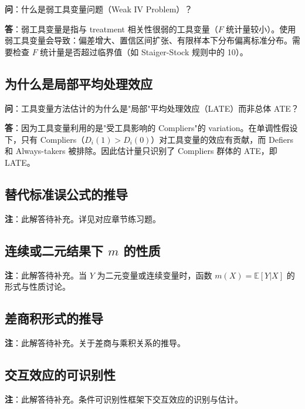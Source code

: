 \textbf{问}：什么是弱工具变量问题（Weak IV Problem）？

\textbf{答}：弱工具变量是指与 treatment 相关性很弱的工具变量（$F$ 统计量较小）。使用弱工具变量会导致：偏差增大、置信区间扩张、有限样本下分布偏离标准分布。需要检查 $F$ 统计量是否超过临界值（如 Staiger-Stock 规则中的 10）。

\subsection{为什么是局部平均处理效应}\label{sec:qa-why-local}

\textbf{问}：工具变量方法估计的为什么是"局部"平均处理效应（LATE）而非总体 ATE？

\textbf{答}：因为工具变量利用的是"受工具影响的 Compliers"的 variation。在单调性假设下，只有 Compliers（$D_i(1) > D_i(0)$）对工具变量的效应有贡献，而 Defiers 和 Always-takers 被排除。因此估计量只识别了 Compliers 群体的 ATE，即 LATE。


\subsection*{替代标准误公式的推导}\label{sec:sol-alternative-si}

\textbf{注}：此解答待补充。详见对应章节练习题。

\subsection*{连续或二元结果下 $m$ 的性质}\label{sec:sol-contin-m-binary-y}

\textbf{注}：此解答待补充。当 $Y$ 为二元变量或连续变量时，函数 $m(X) = \mathbb{E}[Y|X]$ 的形式与性质讨论。

\subsection*{差商积形式的推导}\label{sec:sol-difference-product}

\textbf{注}：此解答待补充。关于差商与乘积关系的推导。

\subsection*{交互效应的可识别性}\label{sec:sol-interaction}

\textbf{注}：此解答待补充。条件可识别性框架下交互效应的识别与估计。

